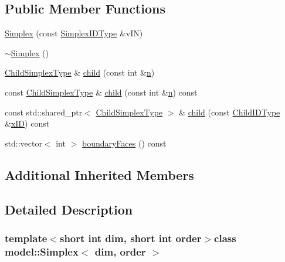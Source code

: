 \subsection*{Public Member Functions}
\begin{DoxyCompactItemize}
\item 
\hyperlink{classmodel_1_1_simplex_a1365175ee8f02c0eacc99e87a4e52b04}{Simplex} (const \hyperlink{classmodel_1_1_simplex_a77f355697a218f3f31a38676ad6ff31d}{Simplex\+I\+D\+Type} \&v\+I\+N)
\item 
\hyperlink{classmodel_1_1_simplex_a740eeb81809d058bb35454e818fe5aca}{$\sim$\+Simplex} ()
\item 
\hyperlink{classmodel_1_1_simplex_a46dfe21eca46643d60dca2f44f1a80fa}{Child\+Simplex\+Type} \& \hyperlink{classmodel_1_1_simplex_a297f2664aea8cf838ddcfd2e89b63859}{child} (const int \&\hyperlink{_f_e_m_2linear__elasticity__3d_2tetgen_2generate_p_o_l_ycube_8m_a74637fc31d6aedd6d61cdc0c8154bc13}{n})
\item 
const \hyperlink{classmodel_1_1_simplex_a46dfe21eca46643d60dca2f44f1a80fa}{Child\+Simplex\+Type} \& \hyperlink{classmodel_1_1_simplex_a22aff7f8339b079fd48ebfb59e27b37a}{child} (const int \&\hyperlink{_f_e_m_2linear__elasticity__3d_2tetgen_2generate_p_o_l_ycube_8m_a74637fc31d6aedd6d61cdc0c8154bc13}{n}) const 
\item 
const std\+::shared\+\_\+ptr$<$ \hyperlink{classmodel_1_1_simplex_a46dfe21eca46643d60dca2f44f1a80fa}{Child\+Simplex\+Type} $>$ \& \hyperlink{classmodel_1_1_simplex_a44a4ad5f8fa04c762bdb9e42d0bc7ad5}{child} (const \hyperlink{classmodel_1_1_simplex_a7b81b988588a5b1aa9d568d0ce2b1702}{Child\+I\+D\+Type} \&\hyperlink{structmodel_1_1_simplex_base_a477508d711a1cb001ccd895f88665a59}{x\+I\+D}) const 
\item 
std\+::vector$<$ int $>$ \hyperlink{classmodel_1_1_simplex_a8660cf410904e02a362a95a69c01f00c}{boundary\+Faces} () const 
\end{DoxyCompactItemize}
\subsection*{Additional Inherited Members}


\subsection{Detailed Description}
\subsubsection*{template$<$short int dim, short int order$>$class model\+::\+Simplex$<$ dim, order $>$}



